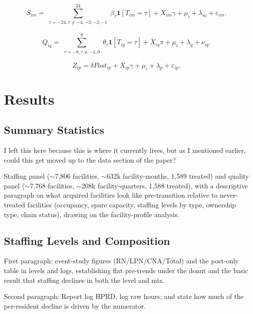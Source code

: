 \documentclass[12pt]{article}
\begin{document}
\begin{equation}
\label{eq:event-study-staffing}
S_{im}
=
\sum_{\substack{\tau=-24, \tau \neq -4,-3,-2,-1}}^{24}
\beta_{\tau}\mathbf{1}[T_{im}=\tau]
+
X_{im}\gamma
+
\mu_i
+
\lambda_m
+
\varepsilon_{im}.
\end{equation}

\begin{equation}
\label{eq:event-study-quality}
Q_{iq}
=
\sum_{\substack{\tau=-8, \tau \neq -1, 0}}^{8}
\theta_{\tau}\mathbf{1}[T_{iq}=\tau]
+
X_{iq}\pi
+
\mu_i
+
\lambda_q
+
\nu_{iq}.
\end{equation}

\begin{equation}
\label{eq:twfe-post}
Z_{ip}
=
\delta \textit{Post}_{ip}
+
X_{ip}\gamma
+
\mu_i
+
\lambda_p
+
\varepsilon_{ip}.
\end{equation}

\section{Results} \label{sec:results}

\subsection{Summary Statistics}

I left this here because this is where it currently lives, but as I mentioned earlier, could this get moved up to the data section of the paper?

Staffing panel ($\sim$7,806 facilities, $\sim$632k facility-months, 1,589 treated) and quality panel ($\sim$7,768 facilities, $\sim$208k facility-quarters, 1,588 treated), with a descriptive paragraph on what acquired facilities look like pre-transition relative to never-treated facilities (occupancy, spare capacity, staffing levels by type, ownership type, chain status), drawing on the facility-profile analysis. 

\subsection{Staffing Levels and Composition} \label{sec:results-staffing}

\noindent First paragraph: event-study figures (RN/LPN/CNA/Total) and the post-only table in levels and logs, establishing flat pre-trends under the donut and the basic result that staffing declines in both the level and mix.

\medskip
\noindent Second paragraph: Report log HPRD, log raw hours; and state how much of the per-resident decline is driven by the numerator. 
\end{document}
